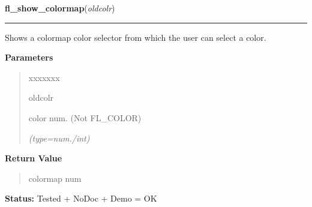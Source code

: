     \label{xformslib:flgoodies:fl_show_colormap}

    \vspace{0.5ex}

\hspace{.8\funcindent}\begin{boxedminipage}{\funcwidth}

    \raggedright \textbf{fl\_show\_colormap}(\textit{oldcolr})

    \vspace{-1.5ex}

    \rule{\textwidth}{0.5\fboxrule}
\setlength{\parskip}{2ex}
    Shows a colormap color selector from which the user can select a color.

\setlength{\parskip}{1ex}
      \textbf{Parameters}
      \vspace{-1ex}

      \begin{quote}
        \begin{Ventry}{xxxxxxx}

          \item[oldcolr]

          color num. (Not FL\_COLOR)

            {\it (type=num./int)}

        \end{Ventry}

      \end{quote}

      \textbf{Return Value}
    \vspace{-1ex}

      \begin{quote}
      colormap num

      \end{quote}

\textbf{Status:} Tested + NoDoc + Demo = OK



    \end{boxedminipage}

    \label{xformslib:flgoodies:fl_show_choices}

    \vspace{0.5ex}

